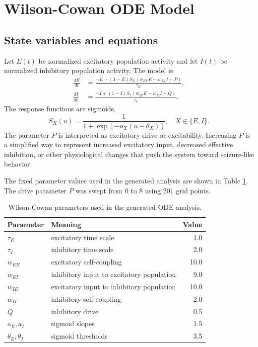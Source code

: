 \documentclass[11pt]{article}
\begin{document}
\section{Wilson-Cowan ODE Model}

\subsection{State variables and equations}

Let $E(t)$ be normalized excitatory population activity and let $I(t)$ be normalized inhibitory population activity. The model is
\begin{align}
\frac{dE}{dt} &= \frac{-E + (1-E)S_E(w_{EE}E - w_{EI}I + P)}{\tau_E}, \label{eq:e}\\
\frac{dI}{dt} &= \frac{-I + (1-I)S_I(w_{IE}E - w_{II}I + Q)}{\tau_I}. \label{eq:i}
\end{align}
The response functions are sigmoids,
\begin{equation}
S_X(u)=\frac{1}{1+\exp[-a_X(u-\theta_X)]}, \quad X\in\{E,I\}.
\end{equation}
The parameter $P$ is interpreted as excitatory drive or excitability. Increasing $P$ is a simplified way to represent increased excitatory input, decreased effective inhibition, or other physiological changes that push the system toward seizure-like behavior.

The fixed parameter values used in the generated analysis are shown in Table \ref{tab:odeparams}. The drive parameter $P$ was swept from 0 to 8 using 201 grid points.

\begin{table}[H]
\centering
\caption{Wilson-Cowan parameters used in the generated ODE analysis.}
\label{tab:odeparams}
\begin{tabular}{llr}
\toprule
Parameter & Meaning & Value \\
\midrule
$\tau_E$ & excitatory time scale & 1.0 \\
$\tau_I$ & inhibitory time scale & 2.0 \\
$w_{EE}$ & excitatory self-coupling & 10.0 \\
$w_{EI}$ & inhibitory input to excitatory population & 9.0 \\
$w_{IE}$ & excitatory input to inhibitory population & 10.0 \\
$w_{II}$ & inhibitory self-coupling & 2.0 \\
$Q$ & inhibitory drive & 0.5 \\
$a_E,a_I$ & sigmoid slopes & 1.5 \\
$\theta_E,\theta_I$ & sigmoid thresholds & 3.5 \\
\bottomrule
\end{tabular}
\end{table}
\end{document}
